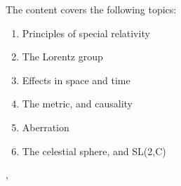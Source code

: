 \documentclass[11pt]{article}
\renewcommand{\today}{\shortmonthname[\the\month] \the \day,  \the\year}
\begin{document}
\vspace{-0.5cm}

The content covers the following topics:

\vspace{-0.25cm}

\begin{multicols}{2}
	\begin{enumerate}
		\item Principles of special relativity
		\item The Lorentz group
		\item Effects in space and time
		\item The metric, and causality
		\item Aberration
		\item The celestial sphere, and SL(2,C)
	\end{enumerate}
\end{multicols}







%
\begin{flushright}
	\tiny \today 
\end{flushright}
\end{document}
